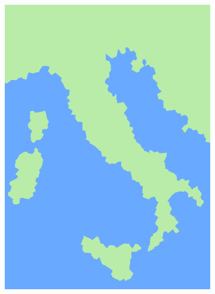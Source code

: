 \documentclass{beamer}
\begin{document}
 \begin{frame}
    
\begin{figure}
    \centering
        \begin{subfigure}[b]{0.3\textwidth}
        \centering
            \includegraphics[width=\textwidth]{images/italy2.png}
    

\end{subfigure}
\end{figure}
\end{frame}
\end{document}
